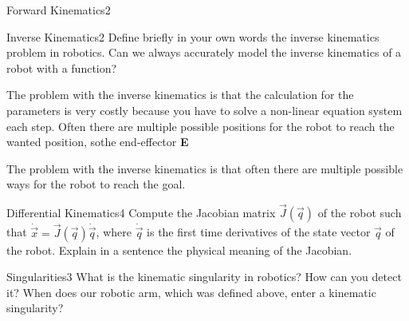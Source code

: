 \begin{questions}
\begin{question}{Forward Kinematics}{2}
\begin{answer}
\end{answer}
\end{question}


\begin{question}{Inverse Kinematics}{2}
Define briefly in your own words the inverse kinematics problem in robotics.  
Can we always accurately model the inverse kinematics of a robot with a
function?

\begin{answer}
The problem with the inverse kinematics is that the calculation for the parameters is very costly because you have to solve a non-linear equation system each step. Often there are multiple possible positions for the robot to reach the wanted position, sothe end-effector \textbf{E}	

The problem with the inverse kinematics is that often there are multiple possible ways for the robot to reach the goal.

\end{answer}

\end{question}


\begin{question}{Differential Kinematics}{4}
Compute the Jacobian matrix $\vec{J}(\vec{q})$ of the robot such that $\dot{\vec{x}}=\vec{J}(\vec{q})\dot{\vec{q}}$, where $\dot{\vec{q}}$ is the first time derivatives of the state vector $\vec{q}$ of the robot. Explain in a sentence the physical meaning of the Jacobian. 

\begin{answer}


\end{answer}

\end{question}


\begin{question}{Singularities}{3}
What is the kinematic singularity in robotics? How can you detect it? When does our robotic arm, which was defined above, enter a kinematic singularity?

\begin{answer}\end{answer}

\end{question}


\end{questions}
